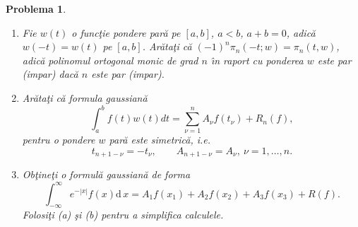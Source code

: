 \documentclass{article}%
\newtheorem{problem}[theorem]{Problema}
\begin{document}
\begin{problem}
\label{pb4.37}

\begin{enumerate}
\item[(a)] Fie $w(t)$ o func\c{t}ie pondere par\u{a} pe $[a,b]$, $a<b$,
$a+b=0$, adic\u{a} $w(-t)=w(t)$ pe $[a,b]$. Ar\u{a}ta\c{t}i c\u{a}
$(-1)^{n}\pi_{n}(-t;w)=\pi_{n}(t,w)$, adic\u{a} polinomul ortogonal monic de
grad $n$ \^{\i}n raport cu ponderea $w$ este par (impar) dac\u{a} $n$ este par (impar).

\item[(b)] Ar\u{a}ta\c{t}i c\u{a} formula gaussian\u{a}
\[
\int_{a}^{b}f(t)w(t)dt=\sum_{\nu=1}^{n}A_{\nu}f(t_{\nu})+R_{n}(f),
\]
pentru o pondere $w$ par\u{a} este simetric\u{a}, i.e.
\[
t_{n+1-\nu}=-t_{\nu},\qquad A_{n+1-\nu}=A_{\nu},~\nu=1,\dots,n.
\]


\item[(c)] Ob\c{t}ine\c{t}i o formul\u{a} gaussian\u{a} de forma%
\[
\int_{-\infty}^{\infty}e^{-|x|}f(x)\mathrm{d}\,x=A_{1}f(x_{1})+A_{2}%
f(x_{2})+A_{3}f(x_{3})+R(f).
\]
Folosi\c{t}i (a) \c{s}i (b) pentru a simplifica calculele.
\end{enumerate}
\end{problem}
\end{document}
